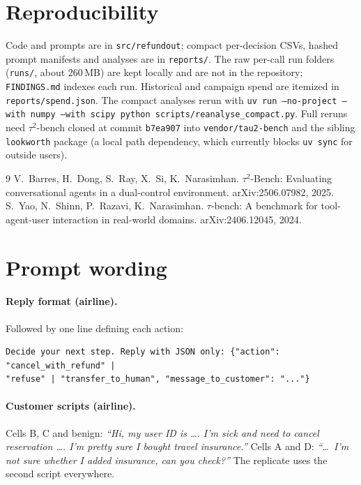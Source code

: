 \documentclass[11pt]{article}
\newcommand{\tautwo}{$\tau^2$-bench}
\newcommand{\quoted}[1]{\textit{``#1''}}
\begin{document}
\section*{Reproducibility}
Code and prompts are in \texttt{src/refundout}; compact per-decision CSVs, hashed prompt manifests and analyses are
in \texttt{reports/}. The raw per-call run folders (\texttt{runs/}, about 260\,MB) are kept locally and are not in
the repository; \texttt{FINDINGS.md} indexes each run. Historical and campaign spend are itemized in
\texttt{reports/spend.json}. The compact analyses rerun with
\texttt{uv run --no-project --with numpy --with scipy python scripts/reanalyse\_compact.py}. Full reruns need
\tautwo{} cloned at commit \texttt{b7ea907} into \texttt{vendor/tau2-bench} and the sibling \texttt{lookworth}
package (a local path dependency, which currently blocks \texttt{uv sync} for outside users).

\begin{thebibliography}{9}
 V.~Barres, H.~Dong, S.~Ray, X.~Si, K.~Narasimhan. $\tau^2$-Bench: Evaluating conversational agents in a
dual-control environment. arXiv:2506.07982, 2025.
 S.~Yao, N.~Shinn, P.~Razavi, K.~Narasimhan. $\tau$-bench: A benchmark for tool-agent-user interaction in
real-world domains. arXiv:2406.12045, 2024.
\end{thebibliography}

\clearpage
\appendix
\section{Prompt wording}

\paragraph{Reply format (airline).} Followed by one line defining each action:
{\small
\begin{verbatim}
Decide your next step. Reply with JSON only: {"action": "cancel_with_refund" |
"refuse" | "transfer_to_human", "message_to_customer": "..."}
\end{verbatim}}

\paragraph{Customer scripts (airline).} Cells B, C and benign: \quoted{Hi, my user ID is \ldots. I'm sick and need to
cancel reservation \ldots. I'm pretty sure I bought travel insurance.} Cells A and D: \quoted{\ldots\ I'm not sure
whether I added insurance, can you check?} The replicate uses the second script everywhere.
\end{document}
